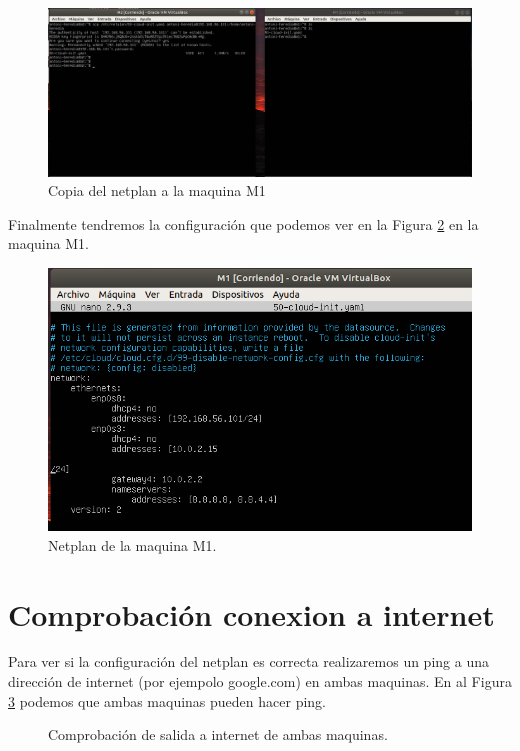 \documentclass[12pt,a4paper]{article}
\begin{document}
\begin{figure}[H]
	\centering
	\includegraphics[width=1\linewidth]{images/scp}
	\caption{Copia del netplan a la maquina M1}
	\label{fig:scp}
\end{figure}
Finalmente tendremos la configuración que podemos ver en la Figura \ref{fig:netplanm1} en la maquina M1. 
\begin{figure}[H]
	\centering
	\includegraphics[width=1\linewidth]{images/netplanm1}
	\caption{Netplan de la maquina M1.}
	\label{fig:netplanm1}
\end{figure}
\section{Comprobación conexion a internet}
Para ver si la configuración del netplan es correcta realizaremos un ping a una dirección de internet (por ejempolo google.com) en ambas maquinas. En al Figura \ref{f:internetm1} podemos que ambas maquinas pueden hacer ping. 
\begin{figure}[H]
	\centering
	\caption{Comprobación de salida a internet de ambas maquinas.}
	
	\label{f:internetm1}
\end{figure}
\end{document}
